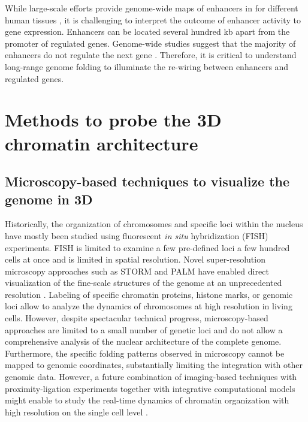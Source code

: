 \documentclass[a4paper,twoside=true,openright,parskip=full,chapterprefix=true,11pt,headings=normal,bibliography=totoc,listof=totoc,titlepage=on,captions=tableabove,draft=false]{scrreprt}
\theoremstyle{definition}
\theoremstyle{definition}
\theoremstyle{definition}
\theoremstyle{remark}
\begin{document}
While large-scale efforts provide genome-wide maps of enhancers in for
different human tissues \citep{Andersson2014}, it is challenging to
interpret the outcome of enhancer activity to gene expression. Enhancers
can be located several hundred kb apart from the promoter of regulated
genes. Genome-wide studies suggest that the majority of enhancers do not
regulate the next gene \citep{Sanyal2012}. Therefore, it is critical to
understand long-range genome folding to illuminate the re-wiring between
enhancers and regulated genes.

\hypertarget{methods-to-probe-the-3d-chromatin-architecture}{%
\section{Methods to probe the 3D chromatin
architecture}\label{methods-to-probe-the-3d-chromatin-architecture}}

\hypertarget{microscopy-based-techniques-to-visualize-the-genome-in-3d}{%
\subsection{Microscopy-based techniques to visualize the genome in
3D}\label{microscopy-based-techniques-to-visualize-the-genome-in-3d}}

Historically, the organization of chromosomes and specific loci within
the nucleus have mostly been studied using fluorescent \emph{in situ}
hybridization (FISH) experiments. FISH is limited to examine a few
pre-defined loci a few hundred cells at once and is limited in spatial
resolution. Novel super-resolution microscopy approaches such as STORM
and PALM have enabled direct visualization of the fine-scale structures
of the genome at an unprecedented resolution \citep{Bonev2016}. Labeling
of specific chromatin proteins, histone marks, or genomic loci allow to
analyze the dynamics of chromosomes at high resolution in living cells.
However, despite spectacular technical progress, microscopy-based
approaches are limited to a small number of genetic loci and do not
allow a comprehensive analysis of the nuclear architecture of the
complete genome. Furthermore, the specific folding patterns observed in
microscopy cannot be mapped to genomic coordinates, substantially
limiting the integration with other genomic data. However, a future
combination of imaging-based techniques with proximity-ligation
experiments together with integrative computational models might enable
to study the real-time dynamics of chromatin organization with high
resolution on the single cell level \citep{Stevens2017, Flyamer2017}.
\end{document}
